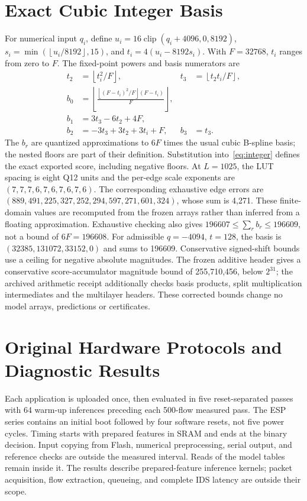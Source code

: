 \documentclass{ieeeaccess}
\newcommand{\floor}[1]{\left\lfloor #1\right\rfloor}
\begin{document}
\appendices
\section{Exact Cubic Integer Basis}
\label{app:arithmetic}
For numerical input $q_i$, define $u_i=16\operatorname{clip}(q_i+4096,0,8192)$, $s_i=\min(\floor{u_i/8192},15)$, and $t_i=4(u_i-8192s_i)$. With $F=32768$, $t_i$ ranges from zero to $F$. The fixed-point powers and basis numerators are
\begin{align}
t_2&=\floor{t_i^2/F},&t_3&=\floor{t_2t_i/F},\\
b_0&=\floor{\frac{\floor{(F-t_i)^2/F}(F-t_i)}{F}},\\
b_1&=3t_3-6t_2+4F,\\
b_2&=-3t_3+3t_2+3t_i+F,&b_3&=t_3.
\end{align}
The $b_r$ are quantized approximations to $6F$ times the usual cubic B-spline basis; the nested floors are part of their definition. Substitution into~\eqref{eq:integer} defines the exact exported score, including negative floors. At $L=1025$, the LUT spacing is eight Q12 units and the per-edge scale exponents are $(7,7,7,6,7,6,7,6,7,6)$. The corresponding exhaustive edge errors are $(889,491,225,327,252,294,597,271,601,324)$, whose sum is 4,271. These finite-domain values are recomputed from the frozen arrays rather than inferred from a floating approximation. Exhaustive checking also gives $196607\leq\sum_r b_r\leq196609$, not a bound of $6F=196608$. For admissible $q=-4094$, $t=128$, the basis is $(32385,131072,33152,0)$ and sums to 196609. Conservative signed-shift bounds use a ceiling for negative absolute magnitudes. The frozen additive header gives a conservative score-accumulator magnitude bound of 255,710,456, below $2^{31}$; the archived arithmetic receipt additionally checks basis products, split multiplication intermediates and the multilayer headers. These corrected bounds change no model arrays, predictions or certificates.

\section{Original Hardware Protocols and Diagnostic Results}
\label{app:historical-hardware}
Each application is uploaded once, then evaluated in five reset-separated passes with 64 warm-up inferences preceding each 500-flow measured pass. The ESP series contains an initial boot followed by four software resets, not five power cycles. Timing starts with prepared features in SRAM and ends at the binary decision. Input copying from Flash, numerical preprocessing, serial output, and reference checks are outside the measured interval. Reads of the model tables remain inside it. The results describe prepared-feature inference kernels; packet acquisition, flow extraction, queueing, and complete IDS latency are outside their scope.
\end{document}
